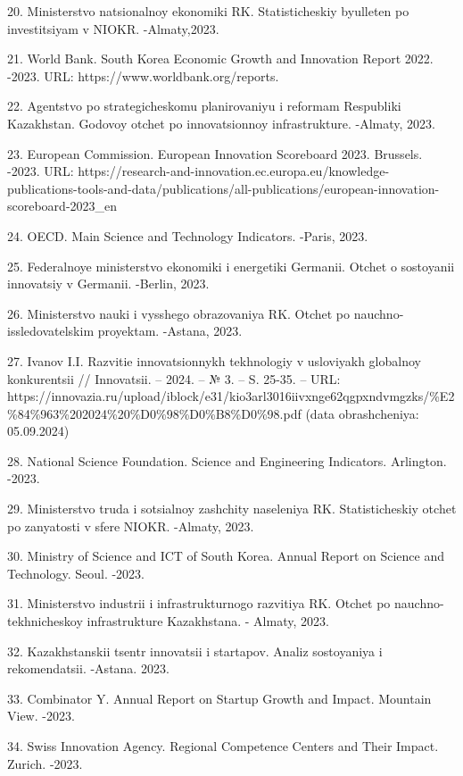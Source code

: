 20. Ministerstvo natsional\textquotesingle noy ekonomiki RK.
Statisticheskiy byulleten\textquotesingle{} po investitsiyam v NIOKR.
-Almaty,2023.

21. World Bank. South Korea Economic Growth and Innovation Report 2022.
-2023. URL: https://www.worldbank.org/reports.

22. Agentstvo po strategicheskomu planirovaniyu i reformam Respubliki
Kazakhstan. Godovoy otchet po innovatsionnoy infrastrukture. -Almaty,
2023.

23. European Commission. European Innovation Scoreboard 2023. Brussels.
-2023. URL:
https://research-and-innovation.ec.europa.eu/knowledge-publications-tools-and-data/publications/all-publications/european-innovation-scoreboard-2023\_en

24. OECD. Main Science and Technology Indicators. -Paris, 2023.

25. Federal\textquotesingle noye ministerstvo ekonomiki i energetiki
Germanii. Otchet o sostoyanii innovatsiy v Germanii. -Berlin, 2023.

26. Ministerstvo nauki i vysshego obrazovaniya RK. Otchet po
nauchno-issledovatelskim proyektam. -Astana, 2023.

27. Ivanov I.I. Razvitie innovatsionnykh tekhnologiy v usloviyakh
globalnoy konkurentsii // Innovatsii. -- 2024. -- № 3. -- S. 25-35. --
URL:
https://innovazia.ru/upload/iblock/e31/kio3arl3016iivxnge62qgpxndvmgzks/\%E2\%84\%963\%202024\%20\%D0\%98\%D0\%B8\%D0\%98.pdf
(data obrashcheniya: 05.09.2024)

28. National Science Foundation. Science and Engineering Indicators.
Arlington. -2023.

29. Ministerstvo truda i sotsial\textquotesingle noy zashchity
naseleniya RK. Statisticheskiy otchet po zanyatosti v sfere NIOKR.
-Almaty, 2023.

30. Ministry of Science and ICT of South Korea. Annual Report on Science
and Technology. Seoul. -2023.

31. Ministerstvo industrii i infrastrukturnogo razvitiya RK. Otchet po
nauchno-tekhnicheskoy infrastrukture Kazakhstana. - Almaty, 2023.

32. Kazakhstanskii tsentr innovatsii i startapov. Analiz sostoyaniya i
rekomendatsii. -Astana. 2023.

33. Combinator Y. Annual Report on Startup Growth and Impact. Mountain
View. -2023.

34. Swiss Innovation Agency. Regional Competence Centers and Their
Impact. Zurich. -2023.

